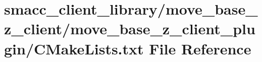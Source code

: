 \hypertarget{client__library_2move__base__z__client_2move__base__z__client__plugin_2CMakeLists_8txt}{}\section{smacc\+\_\+client\+\_\+library/move\+\_\+base\+\_\+z\+\_\+client/move\+\_\+base\+\_\+z\+\_\+client\+\_\+plugin/\+C\+Make\+Lists.txt File Reference}
\label{client__library_2move__base__z__client_2move__base__z__client__plugin_2CMakeLists_8txt}
